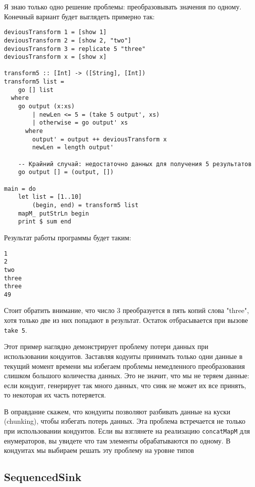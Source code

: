 Я знаю только одно решение проблемы: преобразовывать значения по одному. 
Конечный вариант будет выглядеть примерно так:
\begin{lstlisting}
deviousTransform 1 = [show 1]
deviousTransform 2 = [show 2, "two"]
deviousTransform 3 = replicate 5 "three"
deviousTransform x = [show x]

transform5 :: [Int] -> ([String], [Int])
transform5 list =
    go [] list
  where
    go output (x:xs)
        | newLen <= 5 = (take 5 output', xs)
        | otherwise = go output' xs
      where
        output' = output ++ deviousTransform x
        newLen = length output'

    -- Крайний случай: недостаточно данных для получения 5 результатов
    go output [] = (output, [])

main = do
    let list = [1..10]
        (begin, end) = transform5 list
    mapM_ putStrLn begin
    print $ sum end
\end{lstlisting}    
Результат работы программы будет таким:
\begin{verbatim}
1
2
two
three
three
49
\end{verbatim}
Стоит обратить внимание, что число 3 преобразуется в пять копий слова "three", 
хотя только две из них попадают в результат. Остаток отбрасывается при 
вызове \verb=take 5=.
 
Этот пример наглядно демонстрирует проблему потери данных при использовании 
кондуитов. Заставляя кодуиты принимать только одни данные в текущий момент 
времени мы избегаем проблемы немедленного преобразования слишком большого 
количества данных. Это не значит, что мы не теряем данные: если кондуит, 
генерирует так много данных, что синк не может их все принять, то некоторая их 
часть потеряется.
 
В оправдание скажем, что кондуиты позволяют разбивать данные на куски (chunking), 
чтобы избегать потерь данных.
Эта проблема встречается не только при использовании кондуитов. Если вы 
взглянете на реализацию \lstinline'concatMapM' для енумераторов, вы увидете что 
там элементы обрабатываются по одному. В кондуитах мы выбираем решать эту 
проблему на уровне типов 
 
\subsection{SequencedSink}
 
